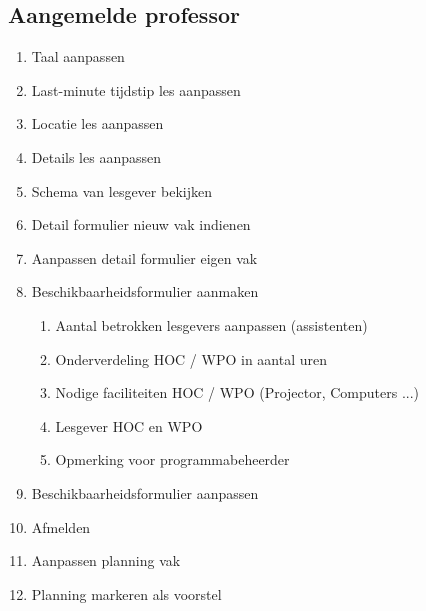 \subsection{Aangemelde professor}
\begin{enumerate}
    \item Taal aanpassen
    \item Last-minute tijdstip les aanpassen 
    \item Locatie les aanpassen
    \item Details les aanpassen
    \item Schema van lesgever bekijken
    \item Detail formulier nieuw vak indienen
    \item Aanpassen detail formulier eigen vak
    \item Beschikbaarheidsformulier aanmaken
    \begin{enumerate}
        \item Aantal betrokken lesgevers aanpassen (assistenten)
        \item Onderverdeling HOC / WPO in aantal uren
        \item Nodige faciliteiten HOC / WPO (Projector, Computers ...)
        \item Lesgever HOC en WPO
        \item Opmerking voor programmabeheerder
    \end{enumerate}
    \item Beschikbaarheidsformulier aanpassen
    \item Afmelden
    \item Aanpassen planning vak
    \item Planning markeren als voorstel
\end{enumerate}

